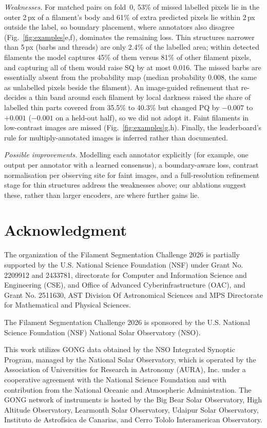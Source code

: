 \documentclass[sigconf]{acmart}
\begin{document}
\emph{Weaknesses.} For matched pairs on fold~0, 53\% of missed labelled pixels lie in the outer 2\,px of a filament's body and 61\% of extra predicted pixels lie within 2\,px outside the label, so boundary placement, where annotators also disagree (Fig.~\ref{fig:examples}e,f), dominates the remaining loss. Thin structures narrower than 5\,px (barbs and threads) are only 2.4\% of the labelled area; within detected filaments the model captures 45\% of them versus 81\% of other filament pixels, and capturing all of them would raise SQ by at most 0.016. The missed barbs are essentially absent from the probability map (median probability 0.008, the same as unlabelled pixels beside the filament). An image-guided refinement that re-decides a thin band around each filament by local darkness raised the share of labelled thin parts covered from 35.5\% to 40.3\% but changed PQ by $-0.007$ to $+0.001$ ($-0.001$ on a held-out half), so we did not adopt it. Faint filaments in low-contrast images are missed (Fig.~\ref{fig:examples}g,h). Finally, the leaderboard's rule for multiply-annotated images is inferred rather than documented.

\emph{Possible improvements.} Modelling each annotator explicitly (for example, one output per annotator with a learned consensus), a boundary-aware loss, contrast normalisation per observing site for faint images, and a full-resolution refinement stage for thin structures address the weaknesses above; our ablations suggest these, rather than larger encoders, are where further gains lie.


\section{Acknowledgment}\label{sec:acknowledgment}
    The organization of the Filament Segmentation Challenge 2026 is partially supported by the U.S. National Science Foundation (NSF) under Grant No. 2209912 and 2433781, directorate for Computer and Information Science and Engineering (CSE), and Office of Advanced Cyberinfrastructure (OAC), and Grant No. 2511630, AST Division Of Astronomical Sciences and MPS Directorate for Mathematical and Physical Sciences.

    The Filament Segmentation Challenge 2026 is sponsored by the U.S. National Science Foundation (NSF) National Solar Observatory (NSO). 

    This work utilizes GONG data obtained by the NSO Integrated Synoptic Program, managed by the National Solar Observatory, which is operated by the Association of Universities for Research in Astronomy (AURA), Inc. under a cooperative agreement with the National Science Foundation and with contribution from the National Oceanic and Atmospheric Administration. The GONG network of instruments is hosted by the Big Bear Solar Observatory, High Altitude Observatory, Learmonth Solar Observatory, Udaipur Solar Observatory, Instituto de Astrofísica de Canarias, and Cerro Tololo Interamerican Observatory.



\end{document}
